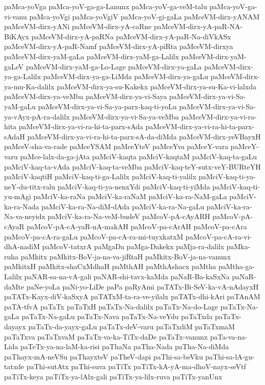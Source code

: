 {paMca-yoVga
paMca-yoV-ga-ga-Lanunx
paMca-yoV-ga-veM-talu
paMca-yoV-ga-vi-vanu
paMca-yoVgi
paMca-yoVgiV
paMca-yoV-gi-gaLa
paMceVM-dirx-yANAM
paMceVM-dirx-yANi
paMceVM-dirx-yA-caRne
paMceVM-dirx-yA-paR-NA-BiKAyx
paMceVM-dirx-yA-paRNa
paMceVM-dirx-yA-paR-Na-diVkASx
paMceVM-dirx-yA-paR-Namf
paMceVM-dirx-yA-piRta
paMceVM-dirxya
paMceVM-dirx-yaM-gaLa
paMceVM-dirx-yaM-ga-Lalilx
paMceVM-dirx-yaM-gaLeV
paMceVM-dirx-yaM-ga-Lo-Lage
paMceVM-dirx-ya-gaLa
paMceVM-dirx-ya-ga-Lalilx
paMceVM-dirx-ya-ga-LiMda
paMceVM-dirx-ya-gaLu
paMceVM-dirx-ya-mu-Ka-dalilx
paMceVM-dirx-ya-su-Kakekx
paMceVM-dirx-ya-su-Ka-vi-lalxda
paMceVM-dirx-ya-veMba
paMceVM-dirx-ya-vi-Saya
paMceVM-dirx-ya-vi-Sa-yaM-gaLu
paMceVM-dirx-ya-vi-Sa-ya-parx-kaq-ti-yoLu
paMceVM-dirx-ya-vi-Sa-ya-vAyx-pA-ra-dalilx
paMceVM-dirx-ya-vi-Sa-ya-veMba
paMceVM-dirx-ya-vi-ra-hita
paMceVM-dirx-ya-vi-ra-hi-ta-parx-sAda
paMceVM-dirx-ya-vi-ra-hi-ta-parx-sAdaH
paMceVM-dirx-ya-vi-ra-hi-ta-parx-sA-da-diMda
paMceVM-dirx-yeVBayxH
paMceV-sha-va-rade
paMceYSAM
paMceYteV
paMceYva
paMceY-vara
paMceY-varu
paMce-lalx-da-ga-jAta
paMciV-kaqta
paMciV-kaqtaM
paMciV-kaq-ta-gaLu
paMciV-kaq-ta-vAda
paMciV-kaq-ta-veMba
paMciV-kaq-teY-sutx-veY-BURteYH
paMciV-kaqtiH
paMciV-kaq-ti-ga-Lalilx
paMciV-kaq-ti-yalilx
paMciV-kaq-ti-ya-neY-du-titx-ralu
paMciV-kaq-ti-ya-nenxYdi
paMciV-kaq-ti-yiMda
paMciV-kaq-ti-yu-mAgi
paMciV-ka-raNa
paMciV-ka-raNaM
paMciV-ka-ra-NaM-gaLa
paMciV-ka-ra-Nada
paMciV-ka-ra-Na-diM-dAda
paMciV-ka-ra-Na-gaLu
paMciV-ka-ra-Na-va-neyidx
paMciV-ka-ra-Na-veM-budeV
paMcoV-pA-cAyARH
paMcoV-pA-cAyaR
paMcoV-pA-cA-yaR-nA-makAH
paMcoV-pa-cArAH
paMcoV-pa-cAra
paMcoV-pa-cA-ra-gaLu
paMcoV-pa-cA-ra-mi-tuyxkatxM
paMcoV-pa-cA-ra-vi-dhA-nadiM
paMcoV-tatxrA
paMgaDa
paMga-Dakekx
paMja-ra-dalilx
paMka-ruha
paMkitx
paMkitx-BoV-ja-na-va-jiRtaH
paMkitx-BoV-ja-na-vanunx
paMkitxH
paMkitx-shaCxMdhaH
paMthAH
paMthAshacx
paMtha
paMtha-ga-Lalilx
paNAR-sa-na-vA-gali
paNAR-shi-tavx-kaMda
paNaR-Ba-kaSxNa
paNaR-daMte
paNe-yoLa
paNi-yo-LiDe
paPa
paRyAmi
paTATx-Bi-SeV-ka-vA-nAdayxH
paTATx-Kayx-diV-kaSxyA
paTATxM-ta-ra-ve-yilalx
paTATx-dhi-kAri
paTAnAM
paTA-tfvA
paTaTx
paTaTxH
paTaTx-Na-dalilx
paTaTx-Na-do-Lage
paTaTx-Na-gaLa
paTaTx-Na-gaLu
paTaTx-Nava
paTaTx-Na-veYdu
paTaTxda
paTaTx-dayayx
paTaTx-da-yayx-gaLu
paTaTx-deV-varu
paTaTxdiM
paTaTxmaM
paTaTxva
paTaTxvaM
paTaTx-va-ka-TiTx-daDe
paTaTx-vanunx
paTa-va-na-Lida
paTeTx-ya-na-laM-ka-risi
paThaNa
paTha-Nada
paTha-Na-diMda
paThayx-mA-neVSu
paThayxteV
paTheV-dapi
paThi-sa-beVku
paThi-sa-lA-gu-tatxde
paThi-sutAtx
paThi-suva
paTiTx
paTiTx-kA-yA-ma-dhoV-nayx-seVtf
paTiTx-keya
paTiTx-ya-lAlx-gali
paTiTx-ya-lilx-ruva
paTiTx-yanUnx
}
